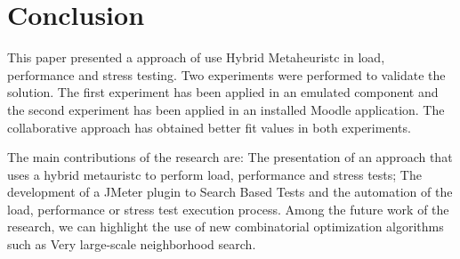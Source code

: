 \section{Conclusion}

This paper presented a approach of use Hybrid Metaheuristc in load, performance and stress testing. Two experiments were performed to validate the solution. The first experiment has been applied in an emulated component and the second experiment has been applied in an installed Moodle application.  The collaborative approach has obtained better fit values in both experiments. 

The main contributions of the research are: The presentation of an approach that uses a hybrid metauristc to perform load, performance and stress tests;  The development of a JMeter plugin  to Search Based Tests and  the automation of the  load, performance or stress test execution process. Among the future work of the research, we can highlight the use of new combinatorial optimization algorithms such as Very large-scale neighborhood search.